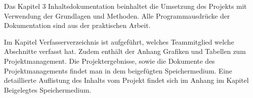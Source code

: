 Das Kapitel 3 Inhaltsdokumentation beinhaltet die Umsetzung des Projekts mit Verwendung der Grundlagen und Methoden. Alle Programmausdrücke der Dokumentation sind aus der praktischen Arbeit.  

Im Kapitel Verfasserverzeichnis ist aufgeführt, welches Teammitglied welche Abschnitte verfasst hat. Zudem enthält der Anhang Grafiken und Tabellen zum Projektmanagement. Die Projektergebnisse, sowie die Dokumente des Projektmanagements findet man in dem beigefügten Speichermedium. Eine detaillierte Auflistung des Inhalts vom Projekt findet sich im Anhang im Kapitel Beigelegtes Speichermedium. 